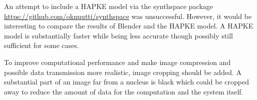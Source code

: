 An attempt to include a HAPKE model via the synthspace package \url{https://github.com/oknuutti/synthspace} was unsuccessful. However, it would be interesting to compare the results of Blender and the HAPKE model. A HAPKE model is substantially faster while being less accurate though possibly still sufficient for some cases.

To improve computational performance and make image compression and possible data transmission more realistic, image cropping should be added. A substantial part of an image far from a nucleus is black which could be cropped away to reduce the amount of data for the computation and the system itself.